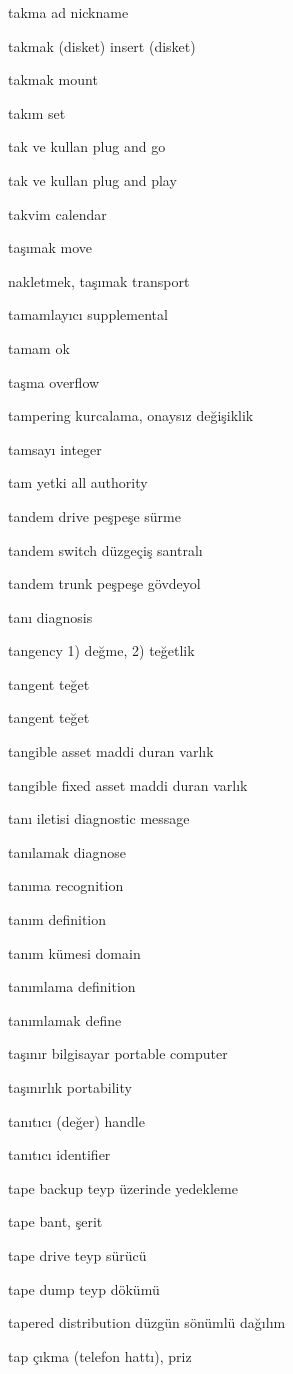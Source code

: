\documentclass[12pt,fleqn]{article}\usepackage{../../common}
\begin{document}
takma ad nickname

takmak (disket) insert (disket)

takmak mount

takım set

tak ve kullan plug and go

tak ve kullan plug and play

takvim calendar

taşımak move

nakletmek, taşımak transport

tamamlayıcı supplemental

tamam ok

taşma overflow

tampering kurcalama, onaysız değişiklik

tamsayı integer

tam yetki all authority

tandem drive peşpeşe sürme

tandem switch düzgeçiş santralı

tandem trunk peşpeşe gövdeyol

tanı diagnosis

tangency 1) değme, 2) teğetlik

tangent teğet

tangent teğet

tangible asset maddi duran varlık

tangible fixed asset maddi duran varlık

tanı iletisi diagnostic message

tanılamak diagnose

tanıma recognition

tanım definition

tanım kümesi domain

tanımlama definition

tanımlamak define

taşınır bilgisayar portable computer

taşınırlık portability

tanıtıcı (değer) handle

tanıtıcı identifier

tape backup teyp üzerinde yedekleme

tape bant, şerit

tape drive teyp sürücü

tape dump teyp dökümü

tapered distribution düzgün sönümlü dağılım

tap çıkma (telefon hattı), priz
\end{document}
